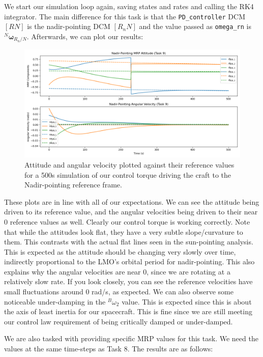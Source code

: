 \documentclass[conf]{new-aiaa}
\begin{document}
We start our simulation loop again, saving states and rates and calling the RK4 integrator. The main difference for this task is that the \texttt{PD\_controller} DCM $[RN]$ is the nadir-pointing DCM $[R_nN]$ and the value passed as \texttt{omega\_rn} is ${}^N\bm\omega_{R_n/N}$.
Afterwards, we can plot our results:
\begin{figure}[H]
    \centering
    \captionsetup{width=.7\linewidth}
    \includegraphics[width=1\linewidth]{task9_nadir_pointing_control.png}
    \caption{Attitude and angular velocity plotted against their reference values for a 500s simulation of our control torque driving the craft to the Nadir-pointing reference frame.}
    \label{fig:enter-label}
\end{figure}

These plots are in line with all of our expectations. We can see the attitude being driven to its reference value, and the angular velocities being driven to their near 0 reference values as well. Clearly our control torque is working correctly. Note that while the attitudes look flat, they have a very subtle slope/curvature to them. This contrasts with the actual flat lines seen in the sun-pointing analysis. This is expected as the attitude should be changing very slowly over time, indirectly proportional to the LMO's orbital period for nadir-pointing. This also explains why the angular velocities are near 0, since we are rotating at a relatively slow rate. If you look closely, you can see the reference velocities have small fluctuations around 0 rad/s, as expected.
We can also observe some noticeable under-damping in the ${}^B\omega_2$ value. This is expected since this is about the axis of least inertia for our spacecraft. This is fine since we are still meeting our control law requirement of being critically damped or under-damped.

We are also tasked with providing specific MRP values for this task. We need the values at the same time-steps as Task 8. The results are as follows:
\end{document}
